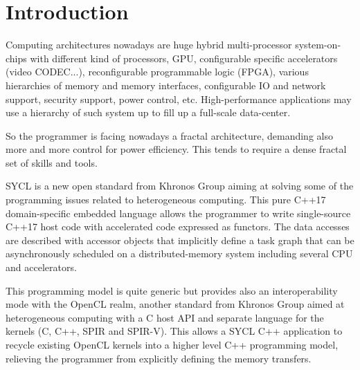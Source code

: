 \documentclass[sigplan, review]{acmart}
\begin{document}



\maketitle

\section{Introduction}
\label{sec:introduction}

Computing architectures nowadays are huge hybrid multi-processor
system-on-chips with different kind of processors, GPU, configurable
specific accelerators (video CODEC...), reconfigurable programmable
logic (FPGA), various hierarchies of memory and memory interfaces,
configurable IO and network support, security support, power control,
etc. High-performance applications may use a hierarchy of such system
up to fill up a full-scale data-center.

So the programmer is facing nowadays a fractal architecture, demanding
also more and more control for power efficiency. This tends to require
a dense fractal set of skills and tools.

SYCL \cite{SYCL-1.2} is a new open standard from Khronos
Group aiming at solving some of the programming issues related to
heterogeneous computing.  This pure C++17 domain-specific embedded
language allows the programmer to write single-source C++17 host code
with accelerated code expressed as functors. The data accesses are
described with accessor objects that implicitly define a task graph
that can be asynchronously scheduled on a distributed-memory system
including several CPU and accelerators.

This programming model is quite generic but provides also an
interoperability mode with the OpenCL realm, another standard from
Khronos Group aimed at heterogeneous computing with a C host API and
separate language for the kernels (C, C++, SPIR and SPIR-V).  This
allows a SYCL C++ application to recycle existing OpenCL kernels into
a higher level C++ programming model, relieving the programmer from
explicitly defining the memory transfers.
\end{document}
